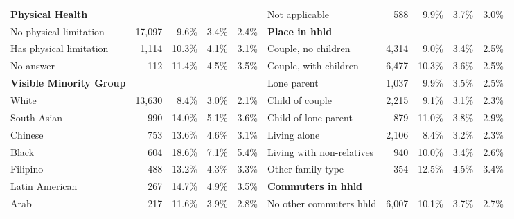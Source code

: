 \documentclass[10 pt,letterpaper]{article}
\begin{document}
\begin{table}[H]
{\begin{tabular}{lrrrrlrrrr}
			\textbf{Physical Health}        &                 &                &                &                & Not applicable               & 588    & 9.9\%          & 3.7\%         & 3.0\%         \\
			No physical limitation          & 17,097          & 9.6\%          & 3.4\%          & 2.4\%          & \textbf{Place in hhld}       &        &                &               &               \\
			Has physical limitation         & 1,114           & 10.3\%         & 4.1\%          & 3.1\%          & Couple, no children          & 4,314  & 9.0\%          & 3.4\%         & 2.5\%         \\
			No answer                       & 112             & 11.4\%         & 4.5\%          & 3.5\%          & Couple, with children        & 6,477  & 10.3\%         & 3.6\%         & 2.5\%         \\
			\textbf{Visible Minority Group} &                 &                &                &                & Lone parent                  & 1,037  & 9.9\%          & 3.5\%         & 2.5\%         \\
			White                           & 13,630          & 8.4\%          & 3.0\%          & 2.1\%          & Child of couple              & 2,215  & 9.1\%          & 3.1\%         & 2.3\%         \\
			South Asian                     & 990             & 14.0\%         & 5.1\%          & 3.6\%          & Child of lone parent         & 879    & 11.0\%         & 3.8\%         & 2.9\%         \\
			Chinese                         & 753             & 13.6\%         & 4.6\%          & 3.1\%          & Living alone                 & 2,106  & 8.4\%          & 3.2\%         & 2.3\%         \\
			Black                           & 604             & 18.6\%         & 7.1\%          & 5.4\%          & Living with non-relatives    & 940    & 10.0\%         & 3.4\%         & 2.6\%         \\
			Filipino                        & 488             & 13.2\%         & 4.3\%          & 3.3\%          & Other family type            & 354    & 12.5\%         & 4.5\%         & 3.4\%         \\
			Latin American                  & 267             & 14.7\%         & 4.9\%          & 3.5\%          & \textbf{Commuters in hhld}   &        &                &               &               \\
			Arab                            & 217             & 11.6\%         & 3.9\%          & 2.8\%          & No other commuters hhld      & 6,007      & 10.1\%         & 3.7\%         & 2.7\%             \\

\end{tabular}}
\end{table}
\end{document}
